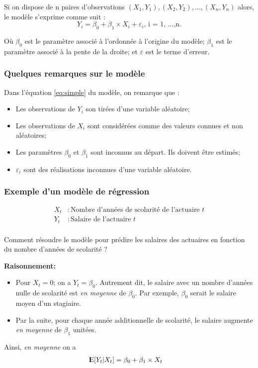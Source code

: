 \documentclass[11pt,french]{report}
\newcommand{\E}{{\rm I\kern-.3em E}}
\begin{document}
Si on dispose de n paires d'observations $(X_1, Y_1), (X_2, Y_2),...,(X_n, Y_n)$ alors, le modèle s'exprime  comme suit :
\begin{equation}
\label{eq:simple}
Y_i = \beta_0 + \beta_1\times X_i + \varepsilon_i \text{,  i = 1, ...,n.}
\end{equation}

Où $\beta_0$ est le paramètre associé à l'ordonnée à l'origine du modèle;
$\beta_1$ est le paramètre associé à la pente de la droite;
et $\varepsilon$ est le terme d'erreur.

\subsubsection*{Quelques remarques sur le modèle}
Dans l'équation \ref{eq:simple} du modèle, on remarque que :
\bigskip
\begin{itemize}
\item Les observations de $Y_i$ son tirées d'une variable aléatoire;
\item Les observations de $X_i$ sont considérées comme des valeurs connues et non aléatoires;
\item Les paramètres $\beta_0$ et $\beta_1$ sont inconnus au départ. Ils doivent être estimés;
\item $\varepsilon_i$ sont des réalisations inconnues d'une variable aléatoire.
\end{itemize}

\subsubsection*{Exemple d'un modèle de régression}
\begin{align*}
X_t &: \text{Nombre d'années de scolarité de l'actuaire } t \\
Y_t &: \text{Salaire de l'actuaire } t\\
\end{align*}

Comment résoudre le modèle pour prédire les salaires des actuaires en fonction du nombre d'années de scolarité ?

\bigskip
\textbf{Raisonnement:}
\begin{itemize}
\item Pour $X_t = 0$; on a $Y_t = \beta_0$. Autrement dit, le salaire avec un nombre d'années nulle de scolarité est \emph{en moyenne} de $\beta_0$. Par exemple, $\beta_0$ serait le salaire moyen d'un stagiaire.
\item Par la suite, pour chaque année additionnelle de scolarité, le salaire augmente \emph{en moyenne }de $\beta_1$ unitées.
\end{itemize}
\bigskip
Ainsi, \emph{en moyenne} on a 
\begin{align*}
\E[Y_t|X_t] &= \beta_0 + \beta_1\times X_t
\end{align*}
\end{document}
